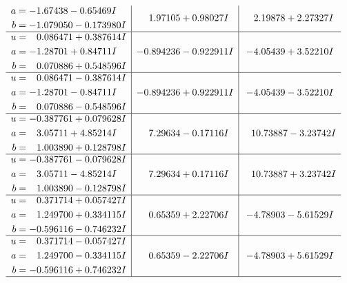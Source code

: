 \documentclass[1p]{elsarticle_modified}
\theoremstyle{definition}
\begin{document}
$$\begin{array}{c|c|c}
\begin{aligned}
a &= -1.67438 - 0.65469 I \\
b &= -1.079050 - 0.173980 I\end{aligned}
 & \phantom{-}1.97105 + 0.98027 I & \phantom{-}2.19878 + 2.27327 I \\ \hline\begin{aligned}
u &= \phantom{-}0.086471 + 0.387614 I \\
a &= -1.28701 + 0.84711 I \\
b &= \phantom{-}0.070886 + 0.548596 I\end{aligned}
 & -0.894236 - 0.922911 I & -4.05439 + 3.52210 I \\ \hline\begin{aligned}
u &= \phantom{-}0.086471 - 0.387614 I \\
a &= -1.28701 - 0.84711 I \\
b &= \phantom{-}0.070886 - 0.548596 I\end{aligned}
 & -0.894236 + 0.922911 I & -4.05439 - 3.52210 I \\ \hline\begin{aligned}
u &= -0.387761 + 0.079628 I \\
a &= \phantom{-}3.05711 + 4.85214 I \\
b &= \phantom{-}1.003890 + 0.128798 I\end{aligned}
 & \phantom{-}7.29634 - 0.17116 I & \phantom{-}10.73887 - 3.23742 I \\ \hline\begin{aligned}
u &= -0.387761 - 0.079628 I \\
a &= \phantom{-}3.05711 - 4.85214 I \\
b &= \phantom{-}1.003890 - 0.128798 I\end{aligned}
 & \phantom{-}7.29634 + 0.17116 I & \phantom{-}10.73887 + 3.23742 I \\ \hline\begin{aligned}
u &= \phantom{-}0.371714 + 0.057427 I \\
a &= \phantom{-}1.249700 + 0.334115 I \\
b &= -0.596116 - 0.746232 I\end{aligned}
 & \phantom{-}0.65359 + 2.22706 I & -4.78903 - 5.61529 I \\ \hline\begin{aligned}
u &= \phantom{-}0.371714 - 0.057427 I \\
a &= \phantom{-}1.249700 - 0.334115 I \\
b &= -0.596116 + 0.746232 I\end{aligned}
 & \phantom{-}0.65359 - 2.22706 I & -4.78903 + 5.61529 I\\
 \hline 
 \end{array}$$\newpage\newpage\renewcommand{\arraystretch}{1}
\end{document}
